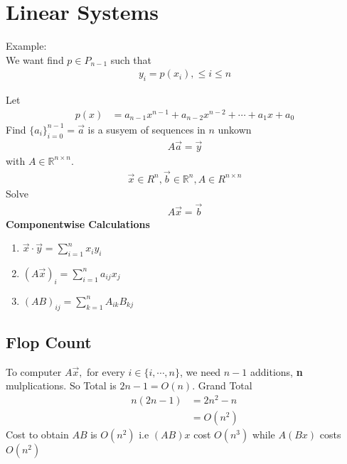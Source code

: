 \documentclass[11pt,oneside]{book}
\theoremstyle{break}
\theoremstyle{break}
\newcommand{\R}{\mathbb{R}}
\newcommand{\example}{\color{purple}Example: \color{black}}
\begin{document}
\chapter[Linear Systems]{Linear Systems}
\example %
\hfill\\
We want find $p\in P_{n-1}$
 such that \begin{align*}
 y_i=p(x_i),\leq i\leq n
 \end{align*}
 
 Let \begin{align*}
p(x)&=a_{n-1}x^{n-1}+a_{n-2}x^{n-2}+\cdots+a_1x+a_0
\end{align*}
Find $\{a_{i}\}_{i=0}^{n-1}=\vec{a}$ is a susyem of sequences in $n$ unkown\begin{align*}
A\vec{a}=\vec{y}
\end{align*}
with $A\in \R^{n\times n}$. \begin{align*}
\vec{x}\in R^n,\vec{b}\in \R^n,A\in R^{n\times n}
\end{align*}
Solve \begin{align*}
A\vec{x}=\vec{b}
\end{align*}
\textbf{Componentwise Calculations}\begin{enumerate}
\item $\vec{x}\cdot \vec{y}=\sum_{i=1}^{n}x_iy_i$
\item $(A\vec{x})_i=\sum_{i=1}^na_{ij}x_j$
\item $(AB)_{ij}=\sum_{k=1}^nA_{ik}B_{kj}$
\end{enumerate}
\section[Flop Count]{Flop Count}
To computer $A\vec{x},$ for every $i\in \{i,\cdots,n\}$, we need \textbf{$n-1$} additions, \textbf{n} mulplications. So Total is $2n-1=O(n)$. Grand Total \begin{align*}
n(2n-1)&=2n^2-n\\
&=O(n^2)
\end{align*}
Cost to obtain $AB$ is $O(n^2)$ i.e $(AB)x$ cost $O(n^3)$ while $A(Bx)$ costs $O(n^2)$\\
\hfill\\
\end{document}
